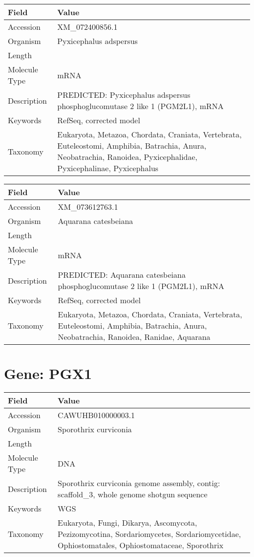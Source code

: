 \documentclass[10pt]{article}
\begin{document}
{\footnotesize
\begin{longtable}{>{\raggedright\arraybackslash}p{4.5cm} >{\raggedright\arraybackslash}p{11.5cm}}
\textbf{Field} & \textbf{Value} \\
\hline
Accession & XM\_072400856.1 \\
Organism & Pyxicephalus adspersus \\
Length & 3347 \\
Molecule Type & mRNA \\
Description & PREDICTED: Pyxicephalus adspersus phosphoglucomutase 2 like 1 (PGM2L1), mRNA \\
Keywords & RefSeq, corrected model \\
Taxonomy & Eukaryota, Metazoa, Chordata, Craniata, Vertebrata, Euteleostomi, Amphibia, Batrachia, Anura, Neobatrachia, Ranoidea, Pyxicephalidae, Pyxicephalinae, Pyxicephalus \\
\end{longtable}
}

{\footnotesize
\begin{longtable}{>{\raggedright\arraybackslash}p{4.5cm} >{\raggedright\arraybackslash}p{11.5cm}}
\textbf{Field} & \textbf{Value} \\
\hline
Accession & XM\_073612763.1 \\
Organism & Aquarana catesbeiana \\
Length & 9202 \\
Molecule Type & mRNA \\
Description & PREDICTED: Aquarana catesbeiana phosphoglucomutase 2 like 1 (PGM2L1), mRNA \\
Keywords & RefSeq, corrected model \\
Taxonomy & Eukaryota, Metazoa, Chordata, Craniata, Vertebrata, Euteleostomi, Amphibia, Batrachia, Anura, Neobatrachia, Ranoidea, Ranidae, Aquarana \\
\end{longtable}
}


\section*{Gene: PGX1}
{\footnotesize
\begin{longtable}{>{\raggedright\arraybackslash}p{4.5cm} >{\raggedright\arraybackslash}p{11.5cm}}
\textbf{Field} & \textbf{Value} \\
\hline
Accession & CAWUHB010000003.1 \\
Organism & Sporothrix curviconia \\
Length & 1228168 \\
Molecule Type & DNA \\
Description & Sporothrix curviconia genome assembly, contig: scaffold\_3, whole genome shotgun sequence \\
Keywords & WGS \\
Taxonomy & Eukaryota, Fungi, Dikarya, Ascomycota, Pezizomycotina, Sordariomycetes, Sordariomycetidae, Ophiostomatales, Ophiostomataceae, Sporothrix \\
\end{longtable}
}
\end{document}
